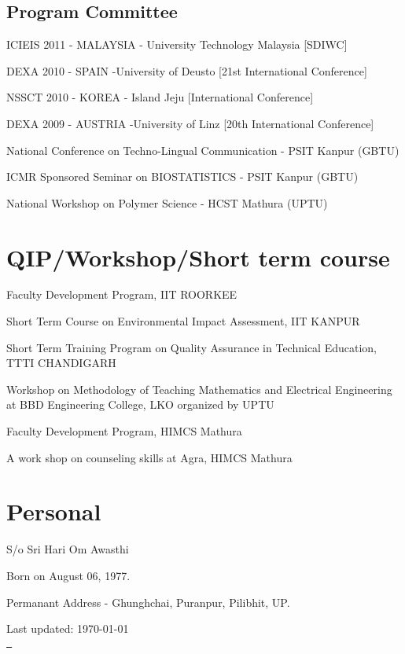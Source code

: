 \documentclass[letterpaper]{article}
\def \footerlink{~}
\renewenvironment{itemize}{
  \begin{list}{}{
    \setlength{\leftmargin}{1.5em}
  }
}{
  \end{list}
}
\begin{document}
\subsection*{Program Committee}
\begin{itemize}
\item ICIEIS 2011 - MALAYSIA - University Technology Malaysia [SDIWC]
\item DEXA 2010 - SPAIN     -University of Deusto  [21st International Conference] 
\item NSSCT 2010 - KOREA    - Island Jeju   [International Conference]
\item DEXA 2009 - AUSTRIA -University of Linz  [20th International Conference]
\item National Conference on Techno-Lingual Communication - PSIT Kanpur (GBTU)
\item ICMR Sponsored Seminar on BIOSTATISTICS -  PSIT Kanpur (GBTU)
\item National Workshop on Polymer Science -  HCST Mathura (UPTU)
\end{itemize}

\section*{QIP/Workshop/Short term course}
\begin{itemize}
\item Faculty Development Program, IIT ROORKEE
\item Short Term Course on Environmental Impact Assessment, IIT KANPUR
\item Short Term Training Program on Quality Assurance in Technical Education, TTTI CHANDIGARH
\item Workshop on Methodology of Teaching Mathematics and Electrical Engineering at
       BBD Engineering College, LKO organized by UPTU
\item Faculty Development Program, HIMCS Mathura
\item A work shop on counseling skills at Agra, HIMCS Mathura 
\end{itemize}

\section*{Personal}

\begin{itemize}
\item S/o Sri Hari Om Awasthi
\item Born on August 06, 1977.
\item Permanant Address - Ghunghchai, Puranpur, Pilibhit, UP.
\end{itemize}

\bigskip

\begin{center}
  \begin{footnotesize}
    Last updated: \today \\
    \href{\footerlink}{\texttt{\footerlink}}
  \end{footnotesize}
\end{center}
\end{document}
